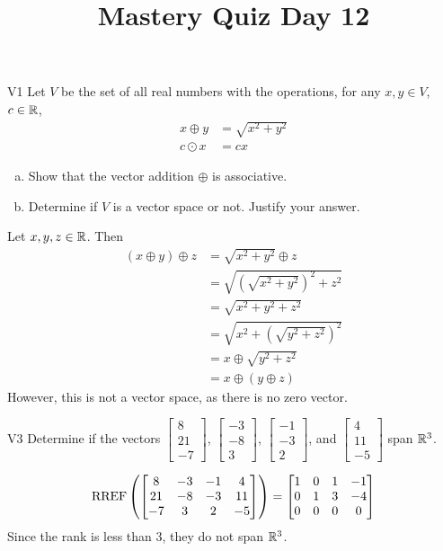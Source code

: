 \documentclass{sbgLAquiz}
\title{Mastery Quiz Day 12 }
\begin{document}
\begin{problem}{V1}
Let $V$ be the set of all real numbers with the operations, for any $x, y \in V$, $c \in \mathbb{R}$,
\begin{align*}
x \oplus y &= \sqrt{x^2+y^2} \\
c \odot x &= c x
\end{align*}
\begin{enumerate}[(a)]
\item Show that the vector addition $\oplus$ is associative.
\item Determine if $V$ is a vector space or not.  Justify your answer.
\end{enumerate}
\end{problem}
\begin{solution}
Let $x,y,z \in \mathbb{R}$.  Then
\begin{align*}
(x\oplus y) \oplus z &= \sqrt{x^2+y^2} \oplus z \\&= \sqrt{ (\sqrt{x^2+y^2})^2+z^2} \\&= \sqrt{x^2+y^2+z^2} \\
&= \sqrt{x^2+(\sqrt{y^2+z^2})^2} \\ &= x \oplus \sqrt{y^2+z^2} \\ &= x \oplus (y \oplus z)
\end{align*}
However, this is not a vector space, as there is no zero vector.
\end{solution}
\begin{problem}{V3}
Determine if the vectors  $\begin{bmatrix} 8 \\ 21 \\ -7 \end{bmatrix}$, $\begin{bmatrix} -3 \\ -8 \\ 3 \end{bmatrix}$, $\begin{bmatrix} -1 \\ -3 \\ 2 \end{bmatrix}$, and $\begin{bmatrix} 4 \\ 11 \\ -5 \end{bmatrix}$ span $\mathbb{R}^3$.
\end{problem}
\begin{solution}
$$\operatorname{RREF}\left(\begin{bmatrix} 8 & -3 & -1 & 4 \\ 21 & -8 & -3 & 11 \\ -7 & 3 & 2 & -5  \end{bmatrix} \right) = \begin{bmatrix} 1 & 0 & 1 & -1 \\ 0 & 1 & 3 & -4 \\ 0 & 0 & 0 & 0\end{bmatrix} $$
Since the rank is less than 3, they do not span $\mathbb{R}^3$.
\end{solution}
\end{document}
